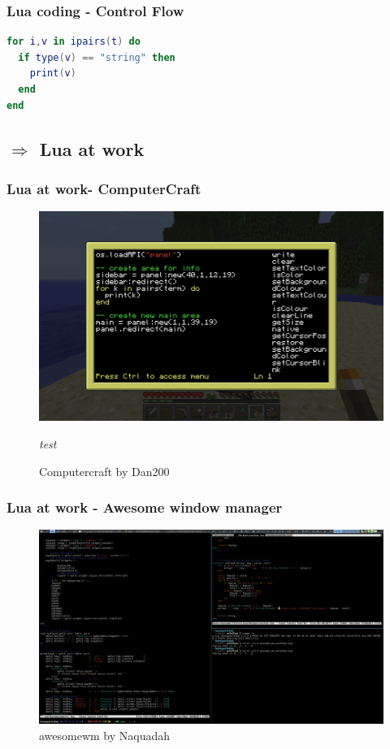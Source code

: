 \documentclass{beamer}
\begin{document}
\begin{frame}[fragile]
    \frametitle{Lua coding - Control Flow}
    \begin{lstlisting}[language=lua]
for i,v in ipairs(t) do
  if type(v) == "string" then
    print(v)
  end
end
    \end{lstlisting}
\end{frame}

\begin{frame}[fragile]
    \section{$ \Rightarrow $ Lua at work}
    \frametitle{Lua at work- ComputerCraft}
    \begin{figure}
        \includegraphics[width=1\textwidth]{computercraft}
        \caption{Computercraft by Dan200}
        \textit{test}
    \end{figure}
\end{frame}

\begin{frame}[fragile]
    \frametitle{Lua at work - Awesome window manager}
    \begin{figure}
        \includegraphics[width=1\textwidth]{awesomewm}
        \caption{awesomewm by Naquadah}
    \end{figure}
\end{frame}
\end{document}
